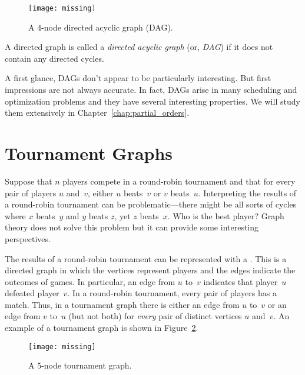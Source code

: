 \begin{figure}


\texttt{[image: missing]}

\caption{A 4-node directed acyclic graph (DAG).}

\label{fig:6ED}

\end{figure}

\begin{definition}
A directed graph is called a \emph{directed acyclic graph} (or,
\emph{DAG}) if it does not contain any directed cycles.
\end{definition}

A first glance, DAGs don't appear to be particularly interesting.  But
first impressions are not always accurate.  In fact, DAGs arise in
many scheduling and optimization problems and they have several
interesting properties.  We will study them extensively in
Chapter~\ref{chap:partial_orders}.

\section{Tournament Graphs}

Suppose that $n$ players compete in a round-robin tournament and that
for every pair of players $u$ and~$v$, either $u$ beats~$v$ or $v$
beats~$u$.  Interpreting the results of a round-robin tournament can
be problematic---there might be all sorts of cycles where $x$
beats~$y$ and $y$ beats $z$, yet $z$ beats~$x$.  Who is the best
player?  Graph theory does not solve this problem but it can provide
some interesting perspectives.

The results of a round-robin tournament can be represented with a
.  This is a directed graph in which the
vertices represent players and the edges indicate the outcomes of
games.  In particular, an edge from $u$ to~$v$ indicates that
player~$u$ defeated player~$v$.  In a round-robin tournament, every
pair of players has a match.  Thus, in a tournament graph there is
either an edge from $u$ to~$v$ or an edge from $v$ to~$u$ (but not
both) for \emph{every} pair of distinct vertices $u$ and~$v$.  An
example of a tournament graph is shown in Figure~\ref{fig:6EE1}.

\begin{figure}


\texttt{[image: missing]}

\caption{A 5-node tournament graph.}

\label{fig:6EE1}

\end{figure}

